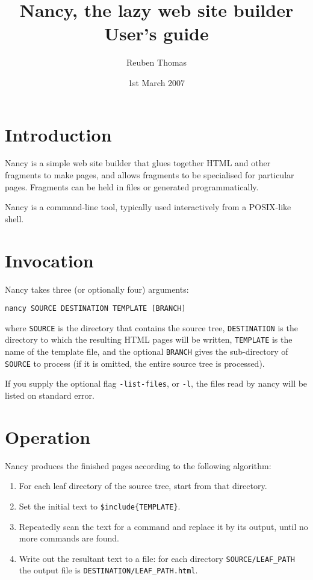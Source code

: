 \documentclass[english]{scrartcl}
\begin{document}
\title{Nancy, the lazy web site builder\\User's guide}
\date{1st March 2007}
\author{Reuben Thomas}
\maketitle

\section{Introduction}

Nancy is a simple web site builder that glues together HTML and other fragments to make pages, and allows fragments to be specialised for particular pages. Fragments can be held in files or generated programmatically.

Nancy is a command-line tool, typically used interactively from a POSIX-like shell.

\section{Invocation}

Nancy takes three (or optionally four) arguments:

\begin{verbatim}
nancy SOURCE DESTINATION TEMPLATE [BRANCH]
\end{verbatim}

\noindent where \verb|SOURCE| is the directory that contains the source tree, \verb|DESTINATION| is the directory to which the resulting HTML pages will be written, \verb|TEMPLATE| is the name of the template file, and the optional \verb|BRANCH| gives the sub-directory of \verb|SOURCE| to process (if it is omitted, the entire source tree is processed).

If you supply the optional flag \verb|-list-files|, or \verb|-l|, the files read by nancy will be listed on standard error.

\section{Operation}
\label{operation}

Nancy produces the finished pages according to the following algorithm:

\begin{enumerate}
\item For each leaf directory of the source tree, start from that directory.
\item Set the initial text to \verb|$include{TEMPLATE}|.
\item Repeatedly scan the text for a command and replace it by its output, until no more commands are found.
\item Write out the resultant text to a file: for each directory \verb|SOURCE/LEAF_PATH| the output file is \verb|DESTINATION/LEAF_PATH.html|.
\end{enumerate}
\end{document}

